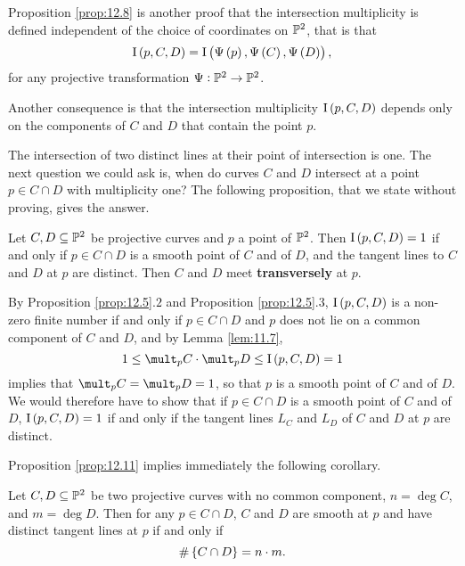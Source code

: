 \begin{remark}
\label{rem:12.9}
Proposition \ref{prop:12.8} is another proof that the intersection multiplicity is defined independent of the choice of coordinates on $ \mathbb{P}^2 $, that is that
$$ \I\br{p, C, D} = \I\br{\Psi\br{p}, \Psi\br{C}, \Psi\br{D}}, $$
for any projective transformation $ \Psi : \mathbb{P}^2 \to \mathbb{P}^2 $.
\end{remark}

\begin{remark}
Another consequence is that the intersection multiplicity $ \I\br{p, C, D} $ depends only on the components of $ C $ and $ D $ that contain the point $ p $.
\end{remark}

The intersection of two distinct lines at their point of intersection is one. The next question we could ask is, when do curves $ C $ and $ D $ intersect at a point $ p \in C \cap D $ with multiplicity one? The following proposition, that we state without proving, gives the answer.

\begin{proposition}
\label{prop:12.11}
Let $ C, D \subseteq \mathbb{P}^2 $ be projective curves and $ p $ a point of $ \mathbb{P}^2 $. Then $ \I\br{p, C, D} = 1 $ if and only if $ p \in C \cap D $ is a smooth point of $ C $ and of $ D $, and the tangent lines to $ C $ and $ D $ at $ p $ are distinct. Then $ C $ and $ D $ meet \textbf{transversely} at $ p $.
\end{proposition}

\begin{remark}
By Proposition \ref{prop:12.5}.$ 2 $ and Proposition \ref{prop:12.5}.$ 3 $, $ \I\br{p, C, D} $ is a non-zero finite number if and only if $ p \in C \cap D $ and $ p $ does not lie on a common component of $ C $ and $ D $, and by Lemma \ref{lem:11.7},
$$ 1 \le \mult_p C \cdot \mult_p D \le \I\br{p, C, D} = 1 $$
implies that $ \mult_p C = \mult_p D = 1 $, so that $ p $ is a smooth point of $ C $ and of $ D $. We would therefore have to show that if $ p \in C \cap D $ is a smooth point of $ C $ and of $ D $, $ \I\br{p, C, D} = 1 $ if and only if the tangent lines $ L_C $ and $ L_D $ of $ C $ and $ D $ at $ p $ are distinct.
\end{remark}

Proposition \ref{prop:12.11} implies immediately the following corollary.

\begin{corollary}
Let $ C, D \subseteq \mathbb{P}^2 $ be two projective curves with no common component, $ n = \deg C $, and $ m = \deg D $. Then for any $ p \in C \cap D $, $ C $ and $ D $ are smooth at $ p $ and have distinct tangent lines at $ p $ if and only if
$$ \#\cbr{C \cap D} = n \cdot m. $$
\end{corollary}

